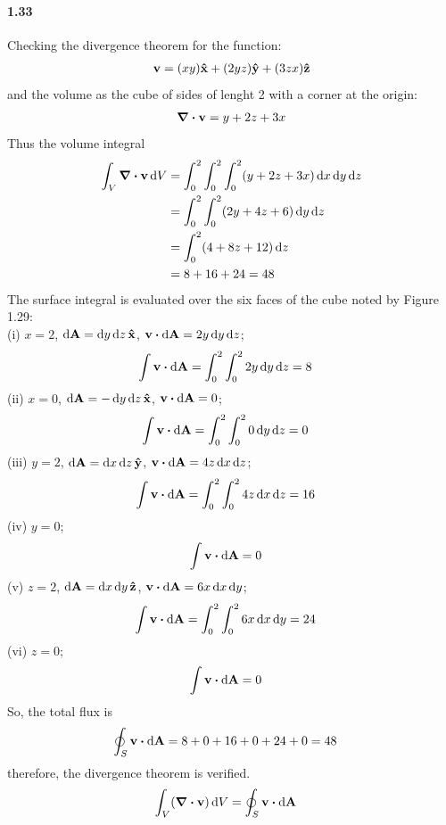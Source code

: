 \documentclass[../main.tex]{subfiles}
\begin{document}
\paragraph{1.33}
Checking the divergence theorem for the function:
\begin{align*}
    \vb{v} = (xy) \vu{x} + (2yz) \vu{y} + (3zx)\vu{z}
\end{align*}
and the volume as the cube of sides of lenght 2 with a corner at the origin:
\begin{align*}
    \div{\vb{v}} = y + 2z + 3x
\end{align*}
Thus the volume integral
\begin{align*}
    \int_V \div{\vb{v}} \dd{V} &= \int_0^2 \int_0^2 \int_0^2(y + 2z + 3x) \dd{x}\dd{y}\dd{z} \\
    &= \int_0^2 \int_0^2 (2y + 4z + 6) \dd{y}\dd{z} \\
    &= \int_0^2 (4 + 8z + 12) \dd{z} \\
    &= 8 + 16 + 24 = 48
\end{align*}
The surface integral is evaluated over the six faces of the cube noted by Figure 1.29: \\
(i) $x = 2$, $\dd{\vb{A}} = \dd{y}\dd{z} \vu{x}$, $\vb{v} \vdot \dd{\vb{A}} = 2y \dd{y}\dd{z}$;
\begin{align*}
    \int \vb{v} \vdot \dd{\vb{A}} &= \int_0^2 \int_0^2 2y \dd{y}\dd{z} = 8
\end{align*}
(ii) $x = 0$, $\dd{\vb{A}} = -\dd{y}\dd{z} \vu{x}$, $\vb{v} \vdot \dd{\vb{A}} = 0$;
\begin{align*}
    \int \vb{v} \vdot \dd{\vb{A}} &= \int_0^2 \int_0^2 0 \dd{y}\dd{z} = 0
\end{align*}
(iii) $y = 2$, $\dd{\vb{A}} = \dd{x}\dd{z} \vu{y}$, $\vb{v} \vdot \dd{\vb{A}} = 4z \dd{x}\dd{z}$;
\begin{align*}
    \int \vb{v} \vdot \dd{\vb{A}} &= \int_0^2 \int_0^2 4z \dd{x}\dd{z} = 16
\end{align*}
(iv) $y = 0$;
\begin{align*}
    \int \vb{v} \vdot \dd{\vb{A}} &= 0
\end{align*}
(v) $z = 2$, $\dd{\vb{A}} = \dd{x}\dd{y} \vu{z}$, $\vb{v} \vdot \dd{\vb{A}} = 6x \dd{x}\dd{y}$;
\begin{align*}
    \int \vb{v} \vdot \dd{\vb{A}} &= \int_0^2 \int_0^2 6x \dd{x}\dd{y} = 24
\end{align*}
(vi) $z = 0$;
\begin{align*}
    \int \vb{v} \vdot \dd{\vb{A}} &= 0
\end{align*}
So, the total flux is
\begin{align*}
    \oint_S \vb{v} \vdot \dd{\vb{A}} &= 8 + 0 + 16 + 0 + 24 + 0 = 48
\end{align*}
therefore, the divergence theorem is verified.
\begin{align*}
    \int_V (\div{\vb{v}}) \dd{V} &= \oint_S \vb{v} \vdot \dd{\vb{A}}
\end{align*}
\newpage
\end{document}
